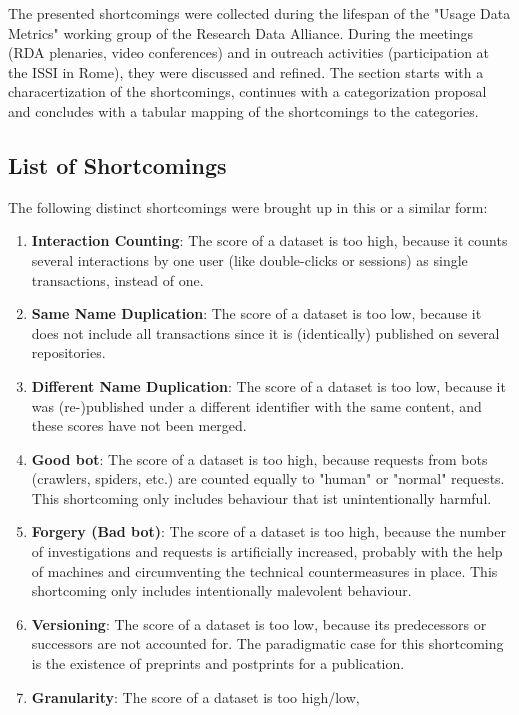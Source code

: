 \documentclass[conference, a4paper]{IEEEtran}\usepackage[]{graphicx}\usepackage[]{color}
\begin{document}
The presented shortcomings were collected during
the lifespan of the "Usage Data Metrics" working group of the Research Data Alliance.
During the meetings (RDA plenaries, video conferences) and in outreach activities
(participation at the ISSI in Rome),
they were discussed and refined.
The section starts with a characertization of the shortcomings,
continues with a categorization proposal
and concludes with a tabular mapping of the shortcomings to the categories.

\subsection{List of Shortcomings}

The following distinct shortcomings were brought up in this or a similar form:

\begin{enumerate}
\item \textbf{Interaction Counting}: The score of a dataset is too high,
because it counts several interactions by one user (like double-clicks or sessions)
as single transactions, instead of one.
\item \textbf{Same Name Duplication}: The score of a dataset is too low,
because it does not include all transactions since it is (identically) published on several repositories.
\item \textbf{Different Name Duplication}: The score of a dataset is too low,
because it was (re-)published under a different identifier with the same content,
and these scores have not been merged.
\item \textbf{Good bot}: The score of a dataset is too high,
because requests from bots (crawlers, spiders, etc.) are counted equally to "human"
or "normal" requests.
This shortcoming only includes behaviour that ist unintentionally harmful.
\item \textbf{Forgery (Bad bot)}: The score of a dataset is too high,
because the number of investigations and requests is artificially increased,
probably with the help of machines and circumventing the technical countermeasures in place.
This shortcoming only includes intentionally malevolent behaviour.
\item \textbf{Versioning}: The score of a dataset is too low,
because its predecessors or successors are not accounted for.
The paradigmatic case for this shortcoming is the existence of preprints and postprints for a publication.
\item \textbf{Granularity}: The score of a dataset is too high/low,

\end{enumerate}
\end{document}
